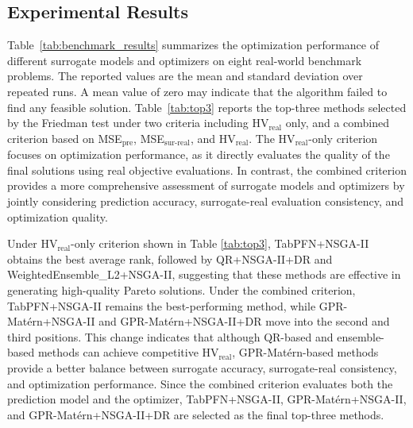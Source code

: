\documentclass[conference]{IEEEtran}
\begin{document}
\subsection{Experimental Results}
Table~\ref{tab:benchmark_results} summarizes the optimization performance of different surrogate models and optimizers on eight real-world benchmark problems. The reported values are the mean and standard deviation over repeated runs. A mean value of zero may indicate that the algorithm failed to find any feasible solution. Table~\ref{tab:top3} reports the top-three methods selected by the Friedman test under two criteria including HV$_{\mathrm{real}}$ only, and a combined criterion based on MSE$_{\mathrm{pre}}$, MSE$_{\mathrm{sur\mbox{-}real}}$, and HV$_{\mathrm{real}}$. The HV$_{\mathrm{real}}$-only criterion focuses on optimization performance, as it directly evaluates the quality of the final solutions using real objective evaluations. In contrast, the combined criterion provides a more comprehensive assessment of surrogate models and optimizers by jointly considering prediction accuracy, surrogate-real evaluation consistency, and optimization quality.

Under HV$_{\mathrm{real}}$-only criterion shown in Table \ref{tab:top3}, TabPFN+NSGA-II obtains the best average rank, followed by QR+NSGA-II+DR and WeightedEnsemble\_L2+NSGA-II, suggesting that these methods are effective in generating high-quality Pareto solutions. Under the combined criterion, TabPFN+NSGA-II remains the best-performing method, while GPR-Mat\'ern+NSGA-II and GPR-Mat\'ern+NSGA-II+DR move into the second and third positions. This change indicates that although QR-based and ensemble-based methods can achieve competitive HV$_{\mathrm{real}}$, GPR-Mat\'ern-based methods provide a better balance between surrogate accuracy, surrogate-real consistency, and optimization performance. Since the combined criterion evaluates both the prediction model and the optimizer, TabPFN+NSGA-II, GPR-Mat\'ern+NSGA-II, and GPR-Mat\'ern+NSGA-II+DR are selected as the final top-three methods.
\end{document}
